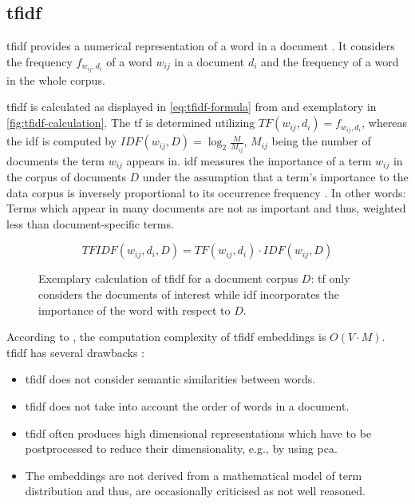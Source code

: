 \subsection{\ac{tfidf}}\label{subsec:tfidf}

\ac{tfidf} provides a numerical representation of a word in a document \cite{clusteringDocs2020}.
It considers the frequency $f_{w_{ij}, d_i}$  of a word $w_{ij}$ in a document $d_i$ and the frequency of a word in the whole corpus. 

\ac{tfidf} is calculated as displayed in \autoref{eq:tfidf-formula} from \cite{clusteringDocs2020} and exemplatory in \autoref{fig:tfidf-calculation}.
The \ac{tf} is determined utilizing $TF(w_{ij}, d_i) = f_{w_{ij}, d_i}$, whereas the \ac{idf} is computed by $IDF(w_{ij}, D) = \log_2\frac{M}{M_{ij}}$, 
$M_{ij}$ being the number of documents the term $w_{ij}$ appears in.
\ac{idf} measures the importance of a term $w_{ij}$ in the corpus of documents $D$
under the assumption that a term's importance to the data corpus is inversely proportional to its occurrence frequency \cite{tfidf2008}.
In other words: Terms which appear in many documents are not as important and thus, weighted less than document-specific terms. 

\begin{equation}
    TFIDF(w_{ij}, d_i, D) = TF(w_{ij}, d_i) \cdot IDF(w_{ij}, D)
    \label{eq:tfidf-formula}
\end{equation}


\begin{figure}[htp] %
    \centering
    
    \caption[Exemplary calculation of \ac{tfidf} values]{
        Exemplary calculation of \ac{tfidf} for a document corpus $D$: 
        \ac{tf} only considers the documents of interest while 
        \ac{idf} incorporates the importance of the word with respect to $D$.
    }
    \label{fig:tfidf-calculation}
\end{figure}

According to \citeauthor{tfidf2008}, the computation complexity of \ac{tfidf} embeddings is $O(V \cdot M)$.
\ac{tfidf} has several drawbacks \cite{clusteringDocs2020,tfidf2008}:
\begin{itemize}
    \item \ac{tfidf} does not consider semantic similarities between words.
    \item \ac{tfidf} does not take into account the order of words in a document.
    \item \ac{tfidf} often produces high dimensional representations which have to be postprocessed to reduce their dimensionality, e.g., by using \ac{pca}.
    \item The embeddings are not derived from a mathematical model of term distribution and thus, are occasionally criticised as not well reasoned.
\end{itemize}